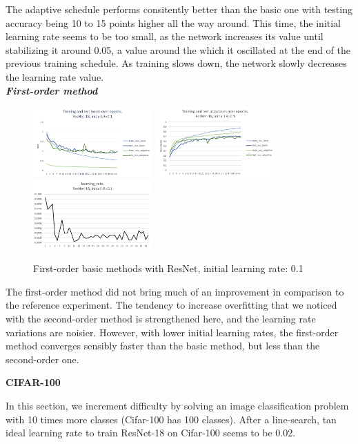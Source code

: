 \documentclass{article}
\begin{document}
  The adaptive schedule performs consitently better than the basic one with testing accuracy being 10 to 15 points higher all the way around. This time, the initial learning rate seems to be too small, as the network increases its value until stabilizing it around 0.05, a value around the which it oscillated at the end of the previous training schedule. As training slows down, the network slowly decreases the learning rate value.\\
  
  \emph{\textbf{First-order method}}
  
  \begin{figure}[!h]
	\includegraphics[width=130pt]{loss_resnet_fo_0_1.png}
	\includegraphics[width=130pt]{acc_resnet_fo_0_1.png}
	\includegraphics[width=130pt]{lr_resnet_fo_0_1.png}
	\caption{First-order basic methods with ResNet, initial learning rate: 0.1}
  \end{figure}

   The first-order method did not bring much of an improvement in comparison to the reference experiment. The tendency to increase overfitting that we noticed with the second-order method is strengthened here, and the learning rate variations are noisier. However, with lower initial learning rates, the first-order method converges sensibly faster than the basic method, but less than the second-order one. 
  
  \textbf{CIFAR-100}
  
  In this section, we increment difficulty by solving an image classification problem with 10 times more classes (Cifar-100 \cite{cifar} has 100 classes). After a line-search, tan ideal learning rate to train ResNet-18 on Cifar-100 seems to be 0.02.
\end{document}
